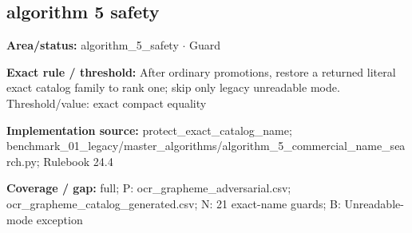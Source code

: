 \subsection*{algorithm 5 safety}
\begin{tcolorbox}[enhanced,breakable,colback=white,colframe=Muted!45,boxrule=0.45pt,arc=1.5pt,left=6pt,right=6pt,top=5pt,bottom=5pt,title={\texttt{A5-EXACT-NAME-PROTECT-21}},title after break={\texttt{A5-EXACT-NAME-PROTECT-21}\ (continued)},fonttitle=\headingfont\bfseries\color{Navy},coltitle=Navy]
\textbf{Area/status:} algorithm\_\allowbreak{}5\_\allowbreak{}safety $\boldsymbol{\cdot}$ Guard\par
\smallskip
\textbf{Exact rule / threshold:} After ordinary promotions, restore a returned literal exact catalog family to rank one; skip only legacy unreadable mode. Threshold/\allowbreak{}value: exact compact equality\par
\smallskip
\textbf{Implementation source:} protect\_\allowbreak{}exact\_\allowbreak{}catalog\_\allowbreak{}name; benchmark\_\allowbreak{}01\_\allowbreak{}legacy/\allowbreak{}master\_\allowbreak{}algorithms/\allowbreak{}algorithm\_\allowbreak{}5\_\allowbreak{}commercial\_\allowbreak{}name\_\allowbreak{}search.py; Rulebook 24.4\par
\smallskip
\textbf{Coverage / gap:} full; P: ocr\_\allowbreak{}grapheme\_\allowbreak{}adversarial.csv; ocr\_\allowbreak{}grapheme\_\allowbreak{}catalog\_\allowbreak{}generated.csv; N: 21 exact-name guards; B: Unreadable-mode exception
\end{tcolorbox}
\medskip
